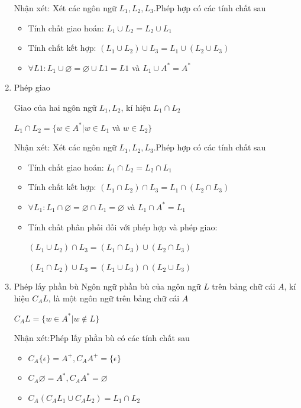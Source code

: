 \documentclass[14pt]{extreport}
\begin{document}
\begin{enumerate}
Nhận xét: Xét các ngôn ngữ $L_1,L_2,L_3$.Phép hợp có các tính chất sau
\begin{itemize}
\item Tính chất giao hoán: $L_1\cup L_2=L_2\cup L_1$
\item Tính chất kết hợp: $\left(L_1\cup L_2 \right)\cup L_3=L_1\cup \left(L_2\cup L_3 \right)$
\item $\forall L1:L_1\cup \varnothing =\varnothing \cup L1=L1$ và $L_1 \cup A^*=A^*$
\end{itemize}

\item Phép giao

Giao của hai ngôn ngữ $L_1,L_2$, kí hiệu $L_1\cap L_2$
\begin{center}
$L_1\cap L_2=\{w\in A^*|w\in L_1$ và $ w\in L_2\}$
\end{center}

Nhận xét: Xét các ngôn ngữ $L_1,L_2,L_3$.Phép hợp có các tính chất sau
\begin{itemize}
\item Tính chất giao hoán: $L_1\cap L_2=L_2\cap L_1$
\item Tính chất kết hợp: $\left(L_1\cap L_2 \right)\cap L_3=L_1\cap \left(L_2\cap L_3 \right)$
\item $\forall L_1:L_1\cap \varnothing =\varnothing \cap L_1=\varnothing$ và $L_1 \cap A^*=L_1$
\item Tính chất phân phối đối với phép hợp và phép giao:
\begin{center}
$\left(L_1\cup L_2\right)\cap L_3=\left(L_1\cap L_3 \right)\cup \left(L_2 \cap L_3\right)$

$\left(L_1\cap L_2\right)\cup L_3=\left(L_1\cup L_3 \right)\cap \left(L_2 \cup L_3\right)$
\end{center}
\end{itemize}

\item Phép lấy phần bù
Ngôn ngữ phần bù của ngôn ngữ $L$ trên bảng chữ cái $A$, kí hiệu $C_AL$, là một ngôn ngữ trên bảng chữ cái $A$
\begin{center}
$C_AL=\{w\in A^*|w\notin L\}$
\end{center}

Nhận xét:Phép lấy phần bù có các tính chất sau
\begin{itemize}
\item $C_A\{\epsilon \}=A^+,C_AA^+=\{\epsilon \}$
\item $C_A \varnothing =A^*,C_AA^*=\varnothing$
\item $C_A\left(C_AL_1 \cup C_AL_2 \right)=L_1 \cap L_2$
\end{itemize}
\end{enumerate}
\end{document}
